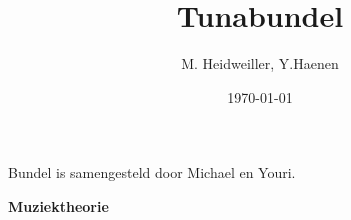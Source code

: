 \documentclass[10pt,a4paper,twoside]{article}
\title{Tunabundel}
\author{M. Heidweiller,  Y.Haenen}
\date{\today}
\begin{document}
\noindent




\clearpage
\renewcommand\contentsname{Lijst met liedjes.}
\tableofcontents
\vfill
Bundel is samengesteld door Michael en Youri.
\clearpage

\raggedright


















 





\appendix
\cleardoublepage
\begin{center}
\vspace*{\fill}
\textbf{\Huge Muziektheorie}
\vspace{50pt}
\vspace*{\fill}
\end{center}
\clearpage
\clearpage
\clearpage
\clearpage
\clearpage
\clearpage

\end{document}
